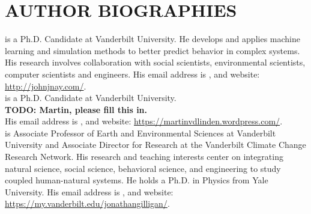 \documentclass{wscpaperproc}\usepackage[]{graphicx}\usepackage[]{color}
\begin{document}


\section*{AUTHOR BIOGRAPHIES}

 is a Ph.D. Candidate at Vanderbilt University. He develops and applies machine learning and simulation methods to better predict behavior in complex systems. His research involves collaboration with social scientists, environmental scientists, computer scientists and engineers. His email address is , and website: \href{https://johnjnay.com/}{http://johnjnay.com/}.\\

 is a Ph.D. Candidate at Vanderbilt University. \\
\textbf{TODO: Martin, please fill this in.}\\
His email address is , and website: \href{https://martinvdlinden.wordpress.com/}{https://martinvdlinden.wordpress.com/}.\\

 is Associate Professor of Earth and Environmental Sciences at Vanderbilt University and Associate Director for Research at the Vanderbilt Climate Change Research Network. His research and teaching interests center on integrating natural science, social science, behavioral science, and engineering to study coupled human-natural systems. He holds a  Ph.D. in Physics from Yale University. His email address is , and website: \href{https://my.vanderbilt.edu/jonathangilligan/}{https://my.vanderbilt.edu/jonathangilligan/}.
\end{document}
